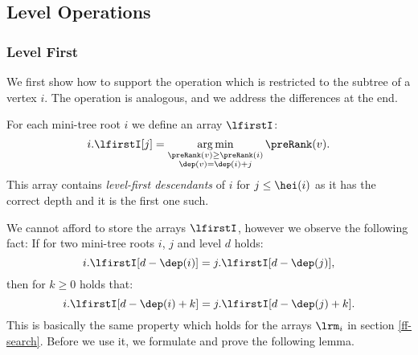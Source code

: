 \subsection{Level Operations}

\subsubsection{Level First}

We first show how to support the operation \levelFirst{} which is restricted to the subtree of a vertex $i$.
The operation \levelLast{} is analogous, and we address the differences at the end.

For each mini-tree root $i$ we define an array $\lfirstI$:
$$ i.\lfirstI[j] = \argmin_{\substack{\preRank(v) \ge \preRank(i) \\ \dep(v) = \dep(i) + j}} \preRank(v). $$
This array contains \emph{level-first descendants} of $i$ for $j \le \hei(i)$ as it has the correct depth and it is the first one such.

We cannot afford to store the arrays $\lfirstI$, however we observe the following fact:
If for two mini-tree roots $i$, $j$ and level $d$ holds:
$$i.\lfirstI[d - \dep(i)] = j.\lfirstI[d - \dep(j)], $$
then for $k \ge 0$ holds that:
$$i.\lfirstI[d - \dep(i) + k] = j.\lfirstI[d - \dep(j) + k].$$
This is basically the same property which holds for the arrays $\lrm_i$ in section \ref{ff-search}.
Before we use it, we formulate and prove the following lemma.

